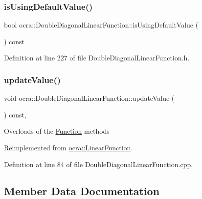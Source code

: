 \subsubsection{\texorpdfstring{is\+Using\+Default\+Value()}{isUsingDefaultValue()}}
{\footnotesize\ttfamily bool ocra\+::\+Double\+Diagonal\+Linear\+Function\+::is\+Using\+Default\+Value (\begin{DoxyParamCaption}{ }\end{DoxyParamCaption}) const\hspace{0.3cm}{\ttfamily [inline]}}



Definition at line 227 of file Double\+Diagonal\+Linear\+Function.\+h.

\hypertarget{classocra_1_1DoubleDiagonalLinearFunction_aee6f818b93d5832a21aa439f13510a49}{}\label{classocra_1_1DoubleDiagonalLinearFunction_aee6f818b93d5832a21aa439f13510a49} 
\subsubsection{\texorpdfstring{update\+Value()}{updateValue()}}
{\footnotesize\ttfamily void ocra\+::\+Double\+Diagonal\+Linear\+Function\+::update\+Value (\begin{DoxyParamCaption}{ }\end{DoxyParamCaption}) const\hspace{0.3cm}{\ttfamily [protected]}, {\ttfamily [virtual]}}

Overloads of the \hyperlink{classocra_1_1Function}{Function} methods 

Reimplemented from \hyperlink{classocra_1_1LinearFunction_a1b9fd7a03a8630055c117d19e0ff019a}{ocra\+::\+Linear\+Function}.



Definition at line 84 of file Double\+Diagonal\+Linear\+Function.\+cpp.



\subsection{Member Data Documentation}
\hypertarget{classocra_1_1DoubleDiagonalLinearFunction_aff7e6eb0c3c53e0799909ab76d279d0a}{}\label{classocra_1_1DoubleDiagonalLinearFunction_aff7e6eb0c3c53e0799909ab76d279d0a} 
